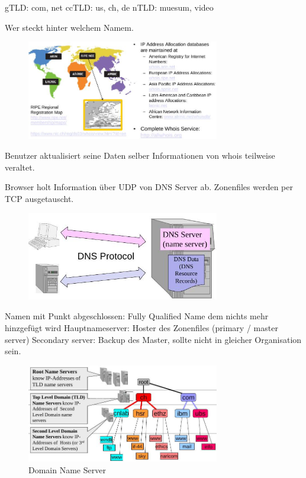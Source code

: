 \documentclass[ngerman,a4paper,12pt]{scrreprt}
\begin{document}
\ul
	\li gTLD: com, net
	\li ccTLD: us, ch, de
	\li nTLD: muesum, video
\ulE

Wer steckt hinter welchem Namem.
\begin{figure}[H]
	\centering
	\includegraphics[width=0.75\textwidth]{img/V13.14.jpg}
	\caption{}
	\label{}
\end{figure}
Benutzer aktualisiert seine Daten selber \ra Informationen von whois teilweise veraltet.

\ul
	\li Browser holt Information über UDP von DNS Server ab.
	\li Zonenfiles werden per TCP ausgetauscht.
\ulE

\begin{figure}[H]
	\centering
	\includegraphics[width=0.75\textwidth]{img/V13.15.jpg}
	\caption{}
	\label{}
\end{figure}
\ul
	\li Namen mit Punkt abgeschlossen: Fully Qualified Name dem nichts mehr hinzgefügt wird
	\li Hauptnameserver: Hoster des Zonenfiles (primary / master server)
	\li Secondary  server: Backup des Master, sollte nicht in gleicher Organisation sein.
	 \li 
\ulE

\begin{figure}[H]
	\centering
	\includegraphics[width=0.75\textwidth]{img/V13.16.jpg}
	\caption{Domain Name Server}
	\label{}
\end{figure}
\end{document}
